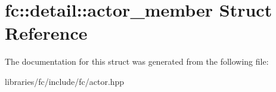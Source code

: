 \hypertarget{structfc_1_1detail_1_1actor__member}{}\section{fc\+:\+:detail\+:\+:actor\+\_\+member Struct Reference}
\label{structfc_1_1detail_1_1actor__member}


The documentation for this struct was generated from the following file\+:\begin{DoxyCompactItemize}
\item 
libraries/fc/include/fc/actor.\+hpp\end{DoxyCompactItemize}
